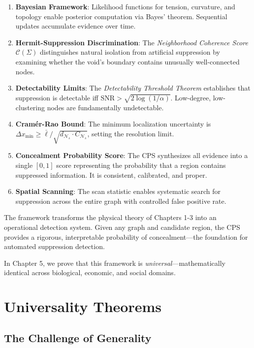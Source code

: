 \documentclass[12pt,a4paper]{article}
\theoremstyle{definition}
\theoremstyle{remark}
\newcommand{\NS}{\mathcal{N}_s}          %
\begin{document}
\begin{enumerate}
    \item \textbf{Bayesian Framework}: Likelihood functions for tension, curvature, and topology enable posterior computation via Bayes' theorem. Sequential updates accumulate evidence over time.
    
    \item \textbf{Hermit-Suppression Discrimination}: The \emph{Neighborhood Coherence Score} $\mathcal{C}(\Sigma)$ distinguishes natural isolation from artificial suppression by examining whether the void's boundary contains unusually well-connected nodes.
    
    \item \textbf{Detectability Limits}: The \emph{Detectability Threshold Theorem} establishes that suppression is detectable iff $\text{SNR} > \sqrt{2\log(1/\alpha)}$. Low-degree, low-clustering nodes are fundamentally undetectable.
    
    \item \textbf{Cramér-Rao Bound}: The minimum localization uncertainty is $\Delta x_{\min} \geq \bar{\ell}/\sqrt{d_{\NS} \cdot C_{\NS}}$, setting the resolution limit.
    
    \item \textbf{Concealment Probability Score}: The CPS synthesizes all evidence into a single $[0,1]$ score representing the probability that a region contains suppressed information. It is consistent, calibrated, and proper.
    
    \item \textbf{Spatial Scanning}: The scan statistic enables systematic search for suppression across the entire graph with controlled false positive rate.
\end{enumerate}

The framework transforms the physical theory of Chapters 1-3 into an operational detection system. Given any graph and candidate region, the CPS provides a rigorous, interpretable probability of concealment—the foundation for automated suppression detection.

In Chapter 5, we prove that this framework is \emph{universal}—mathematically identical across biological, economic, and social domains.

\newpage
\section{Universality Theorems}

\subsection{The Challenge of Generality}
\end{document}
